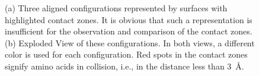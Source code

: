 \documentclass[twocolumn]{bmcart}%
\def\ExpView {Exploded View\xspace}
\begin{document}
\begin{figure}[tb]
    \centering
    \vspace{-4pt}
    \caption{(a) Three aligned configurations represented by surfaces with highlighted contact zones. It is obvious that such a representation is insufficient for the observation and comparison of the contact zones. (b) \ExpView of these configurations. In both views, a different color is used for each configuration. Red spots in the contact zones signify amino acids in collision, i.e., in the distance less than 3~\AA.}
	\label{fig:case12}
\end{figure}

\end{document}
